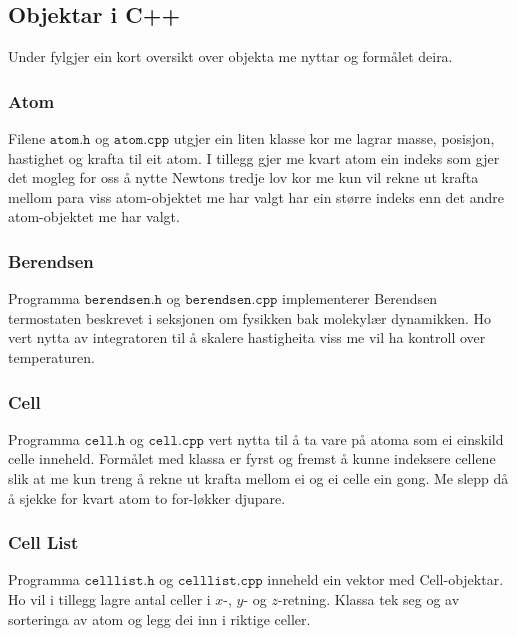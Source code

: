 \documentclass[12pt, a4paper]{article}
\theoremstyle{definition} \newtheorem*{definition}{Teorem}
\begin{document}
    \subsection*{Objektar i C++}
        Under fylgjer ein kort oversikt over objekta me nyttar og formålet deira.

        \subsubsection*{Atom}
            Filene $\texttt{atom.h}$ og $\texttt{atom.cpp}$ utgjer ein liten klasse kor me lagrar masse, posisjon, hastighet og krafta til eit atom. I tillegg 
            gjer me kvart atom ein indeks som gjer det mogleg for oss å nytte Newtons tredje lov kor me kun vil rekne ut krafta mellom para viss atom-objektet me
            har valgt har ein større indeks enn det andre atom-objektet me har valgt.

        \subsubsection*{Berendsen}
            Programma $\texttt{berendsen.h}$ og $\texttt{berendsen.cpp}$ implementerer Berendsen termostaten beskrevet i seksjonen om fysikken bak molekylær dynamikken.
            Ho vert nytta av integratoren til å skalere hastigheita viss me vil ha kontroll over temperaturen.

        \subsubsection*{Cell}
            Programma $\texttt{cell.h}$ og $\texttt{cell.cpp}$ vert nytta til å ta vare på atoma som ei einskild celle inneheld. Formålet med klassa er fyrst og fremst
            å kunne indeksere cellene slik at me kun treng å rekne ut krafta mellom ei og ei celle ein gong. Me slepp då å sjekke for kvart atom to for-løkker djupare.

        \subsubsection*{Cell List}
            Programma $\texttt{celllist.h}$ og $\texttt{celllist.cpp}$ inneheld ein vektor med Cell-objektar. Ho vil i tillegg lagre antal celler i $x$-, $y$- og $z$-retning.
            Klassa tek seg og av sorteringa av atom og legg dei inn i riktige celler.
\end{document}

